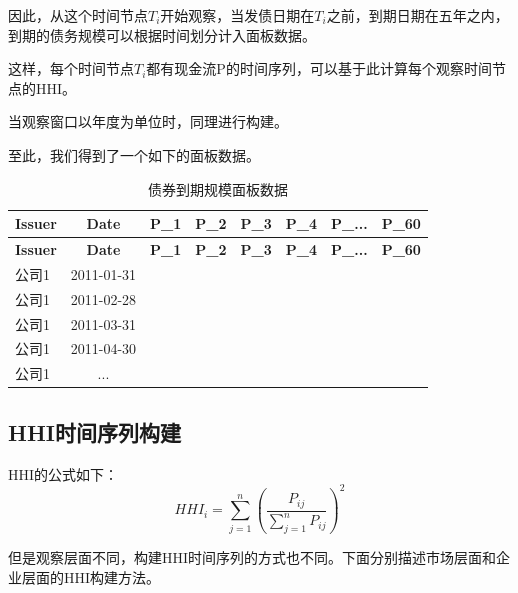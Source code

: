 \documentclass[a4paper,12pt]{report}
\begin{document}
    因此，从这个时间节点$T_i$开始观察，当发债日期在$T_i$之前，到期日期在五年之内，到期的债务规模可以根据时间划分计入面板数据。

    这样，每个时间节点$T_i$都有现金流P的时间序列，可以基于此计算每个观察时间节点的HHI。

    当观察窗口以年度为单位时，同理进行构建。

    至此，我们得到了一个如下的面板数据。

    \begin{longtable}{|l|c|r|r|r|r|r|r|}
        \caption{债券到期规模面板数据} \label{tab:bond-distribution} \\
        
        \hline
        \textbf{Issuer} & \textbf{Date} & \textbf{P\_1} & \textbf{P\_2} & \textbf{P\_3} & \textbf{P\_4} & \textbf{P\_...} & \textbf{P\_60}  \\ \hline
        \endfirsthead
        
        \hline
        \textbf{Issuer} & \textbf{Date} & \textbf{P\_1} & \textbf{P\_2} & \textbf{P\_3} & \textbf{P\_4} & \textbf{P\_...} & \textbf{P\_60}  \\ \hline
        \endhead
        
        \hline
        \endfoot
        
        公司1 & 2011-01-31 &  &  &  &  &  &   \\ \hline
        公司1 & 2011-02-28 &  &  &  &  &  &   \\ \hline
        公司1 & 2011-03-31 &  &  &  &  &  &   \\ \hline
        公司1 & 2011-04-30 &  &  &  &  &  &   \\ \hline
        公司1 &     ...    &  &  &  &  &  &   \\ \hline
        
    \end{longtable}

    \subsection{HHI时间序列构建}
    HHI的公式如下：$$HHI_i = \sum_{j=1}^{n} (\frac{P_{ij}}{\sum_{j=1}^{n} P_{ij}})^2$$
    
    但是观察层面不同，构建HHI时间序列的方式也不同。下面分别描述市场层面和企业层面的HHI构建方法。
\end{document}
